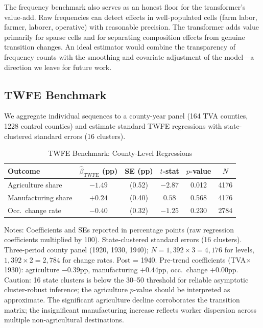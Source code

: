\documentclass[12pt]{article}
\begin{document}
The frequency benchmark also serves as an honest floor for the transformer's value-add. Raw frequencies can detect effects in well-populated cells (farm labor, farmer, laborer, operative) with reasonable precision. The transformer adds value primarily for sparse cells and for separating composition effects from genuine transition changes. An ideal estimator would combine the transparency of frequency counts with the smoothing and covariate adjustment of the model---a direction we leave for future work.

\subsection{TWFE Benchmark}

We aggregate individual sequences to a county-year panel (164 TVA counties, \num{1228} control counties) and estimate standard TWFE regressions with state-clustered standard errors (16 clusters).

\begin{table}[H]
\centering
\caption{TWFE Benchmark: County-Level Regressions}
\label{tab:twfe}
\begin{threeparttable}
\begin{tabular}{lccccc}
\toprule
Outcome & $\hat{\beta}_{\text{TWFE}}$ (pp) & SE (pp) & $t$-stat & $p$-value & $N$ \\
\midrule
Agriculture share & $-1.49$ & (0.52) & $-2.87$ & 0.012 & \num{4176} \\
Manufacturing share & $+0.24$ & (0.40) & $0.58$ & 0.568 & \num{4176} \\
Occ.\ change rate & $-0.40$ & (0.32) & $-1.25$ & 0.230 & \num{2784} \\
\bottomrule
\end{tabular}
\begin{tablenotes}[flushleft]
\small
\item Notes: Coefficients and SEs reported in percentage points (raw regression coefficients multiplied by 100). State-clustered standard errors (16 clusters). Three-period county panel (1920, 1930, 1940); $N = 1{,}392 \times 3 = 4{,}176$ for levels, $1{,}392 \times 2 = 2{,}784$ for change rates. Post = 1940. Pre-trend coefficients (TVA$\times$1930): agriculture $-0.39$pp, manufacturing $+0.44$pp, occ.\ change $+0.00$pp. Caution: 16 state clusters is below the 30--50 threshold for reliable asymptotic cluster-robust inference; the agriculture $p$-value should be interpreted as approximate. The significant agriculture decline corroborates the transition matrix; the insignificant manufacturing increase reflects worker dispersion across multiple non-agricultural destinations.
\end{tablenotes}
\end{threeparttable}
\end{table}
\end{document}
